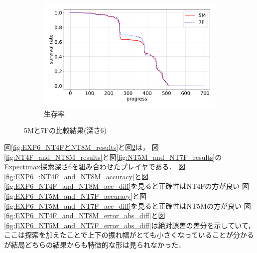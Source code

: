 \begin{figure}[t]
\begin{subfigure}[b]{0.8\linewidth}
    \includegraphics[width=\linewidth]{pdf/compare/EXP6_NT5M_and_NT7F/survival.pdf}
    \caption{生存率}
    \label{fig:EXP6_NT5M_and_NT7F_survival}
\end{subfigure}
\caption{5Mと7Fの比較結果(深さ6)}
\label{fig:EXP6_NT5M_and_NT7F_results}
\end{figure}

図\ref{fig:EXP6_NT4FとNT8M_results}と図\ref{fig:EXP6_NT5M_and_NT7F_results}は，
図\ref{fig:NT4F_and_NT8M_results}と図\ref{fig:NT5M_and_NT7F_results}のExpectimax探索深さ6を組み合わせたプレイヤである．
図\ref{fig:EXP6_:NT4F_and_NT8M_accuracy}と図\ref{fig:EXP6_NT4F_and_NT8M_acc_diff}を見ると正確性はNT4Fの方が良い
図\ref{fig:EXP6_NT5M_and_NT7F_accuracy}と図\ref{fig:EXP6_NT5M_and_NT7F_acc_diff}を見ると正確性はNT5Mの方が良い
図\ref{fig:EXP6_NT4F_and_NT8M_error_abs_diff}と図\ref{fig:EXP6_NT5M_and_NT7F_error_abs_diff}は絶対誤差の差分を示していて，
ここは探索を加えたことで上下の振れ幅がとても小さくなっていることが分かるが結局どちらの結果からも特徴的な形は見られなかった．

